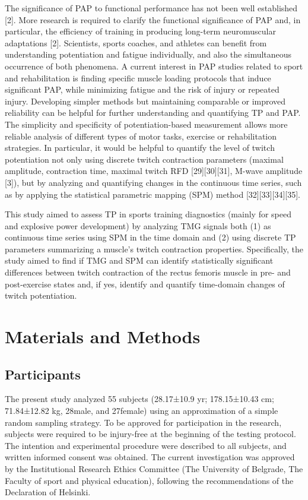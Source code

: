 \documentclass[utf8]{style/FrontiersinHarvard}
\begin{document}
The significance of PAP to functional performance has not been well established [2].
More research is required to clarify the functional significance of PAP and, in particular, the efficiency of training in producing long-term neuromuscular adaptations [2].
Scientists, sports coaches, and athletes can benefit from understanding potentiation and fatigue individually, and also the simultaneous occurrence of both phenomena. %
A current interest in PAP studies related to sport and rehabilitation is finding specific muscle loading protocols that induce significant PAP, while minimizing fatigue and the risk of injury or repeated injury.
Developing simpler methods but maintaining comparable or improved reliability can be helpful for further understanding and quantifying TP and PAP. %
The simplicity and specificity of potentiation-based measurement allows more reliable analysis of different types of motor tasks, exercise or rehabilitation strategies.
In particular, it would be helpful to quantify the level of twitch potentiation not only using discrete twitch contraction parameters (maximal amplitude, contraction time, maximal twitch RFD [29][30][31], M-wave amplitude [3]), but by analyzing and quantifying changes in the continuous time series, such as by applying the statistical parametric mapping (SPM) method [32][33][34][35].

This study aimed to assess TP in sports training diagnostics (mainly for speed and explosive power development) by analyzing TMG signals both (1) as continuous time series using SPM in the time domain and (2) using discrete TP parameters summarizing a muscle's twitch contraction properties.
Specifically, the study aimed to find if TMG and SPM can identify statistically significant differences between twitch contraction of the rectus femoris muscle in pre- and post-exercise states and, if yes, identify and quantify time-domain changes of twitch potentiation.

\section{Materials and Methods}
\subsection{Participants}
The present study analyzed 55 subjects (28.17±10.9 yr; 178.15±10.43 cm; 71.84±12.82 kg, 28male, and 27female) using an approximation of a simple random sampling strategy.
To be approved for participation in the research, subjects were required to be injury-free at the beginning of the testing protocol.
The intention and experimental procedure were described to all subjects, and written informed consent was obtained.
The current investigation was approved by the Institutional Research Ethics Committee (The University of Belgrade, The Faculty of sport and physical education), following the recommendations of the Declaration of Helsinki.
\end{document}

